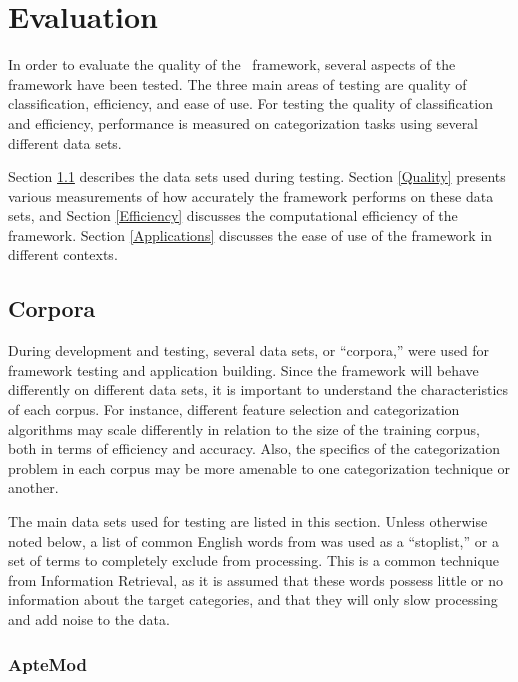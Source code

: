 \chapter{Evaluation}

In order to evaluate the quality of the \aicat\ framework, several
aspects of the framework have been tested.  The three main areas of
testing are quality of classification, efficiency, and ease of use.
For testing the quality of classification and efficiency, performance
is measured on categorization tasks using several different data sets.

Section \ref{Corpora} describes the data sets used during testing.
Section \ref{Quality} presents various measurements of how accurately
the framework performs on these data sets, and Section
\ref{Efficiency} discusses the computational efficiency of the
framework.  Section \ref{Applications} discusses the ease of use of
the framework in different contexts.


\section{Corpora}
\label{Corpora}

During development and testing, several data sets, or ``corpora,''
were used for framework testing and application building.  Since the
framework will behave differently on different data sets, it is
important to understand the characteristics of each corpus.  For
instance, different feature selection and categorization algorithms
may scale differently in relation to the size of the training corpus,
both in terms of efficiency and accuracy.\cite{chakrabarti:98} Also,
the specifics of the categorization problem in each corpus may be more
amenable to one categorization technique or another.

The main data sets used for testing are listed in this section.
Unless otherwise noted below, a list of common English words from
\cite{salton:89} was used as a ``stoplist,'' or a set of terms to
completely exclude from processing.  This is a common technique from
Information Retrieval,\cite{XXX} as it is assumed that these words
possess little or no information about the target categories, and that
they will only slow processing and add noise to the data.


\subsection{ApteMod}


